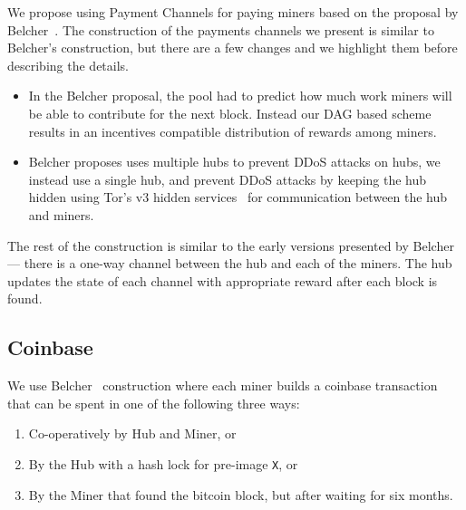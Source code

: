 \documentclass{article}
\begin{document}
We propose using Payment Channels for paying miners based on the
proposal by Belcher~\cite{channels-for-rewards}. The construction of
the payments channels we present is similar to Belcher's construction,
but there are a few changes and we highlight them before describing
the details.

\begin{itemize}
\item In the Belcher proposal, the pool had to predict how much work
  miners will be able to contribute for the next block. Instead our
  DAG based scheme results in an incentives compatible distribution of
  rewards among miners.
\item Belcher proposes uses multiple hubs to prevent DDoS attacks on
  hubs, we instead use a single hub, and prevent DDoS attacks by
  keeping the hub hidden using Tor's v3 hidden
  services~\cite{tor-design} for communication between the hub and
  miners.
\end{itemize}

The rest of the construction is similar to the early versions
presented by Belcher --- there is a one-way channel between the hub
and each of the miners. The hub updates the state of each channel with
appropriate reward after each block is found.



\subsection{Coinbase}

We use Belcher~\cite{channels-for-rewards} construction where each
miner builds a coinbase transaction that can be spent in one of the
following three ways:

\begin{enumerate}
\item Co-operatively by Hub and Miner, or
\item By the Hub with a hash lock for pre-image \verb|X|, or
\item By the Miner that found the bitcoin block, but after waiting for
  six months.
\end{enumerate}
\end{document}
